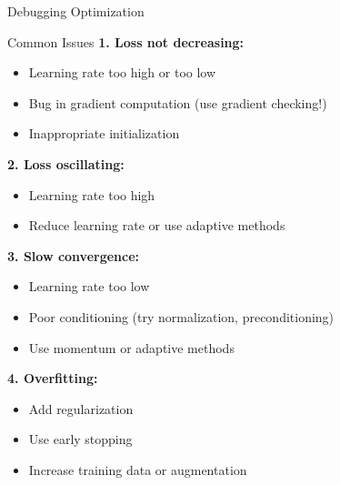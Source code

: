 \documentclass[aspectratio=169]{beamer}
\begin{document}
\begin{frame}{Debugging Optimization}
  \begin{alertbox}{Common Issues}
    \textbf{1. Loss not decreasing:}
    \begin{itemize}
      \item Learning rate too high or too low
      \item Bug in gradient computation (use gradient checking!)
      \item Inappropriate initialization
    \end{itemize}

    \textbf{2. Loss oscillating:}
    \begin{itemize}
      \item Learning rate too high
      \item Reduce learning rate or use adaptive methods
    \end{itemize}

    \textbf{3. Slow convergence:}
    \begin{itemize}
      \item Learning rate too low
      \item Poor conditioning (try normalization, preconditioning)
      \item Use momentum or adaptive methods
    \end{itemize}

    \textbf{4. Overfitting:}
    \begin{itemize}
      \item Add regularization
      \item Use early stopping
      \item Increase training data or augmentation
    \end{itemize}
  \end{alertbox}
\end{frame}
\end{document}
